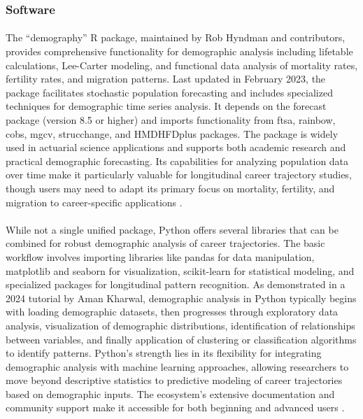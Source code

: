 \documentclass[../main.tex]{subfiles}
\begin{document}
\subsubsection{Software}

\paragraph{} The ``demography'' R package, maintained by Rob Hyndman and contributors, provides comprehensive functionality for demographic analysis including lifetable calculations, Lee-Carter modeling, and functional data analysis of mortality rates, fertility rates, and migration patterns. Last updated in February 2023, the package facilitates stochastic population forecasting and includes specialized techniques for demographic time series analysis. It depends on the forecast package (version 8.5 or higher) and imports functionality from ftsa, rainbow, cobs, mgcv, strucchange, and HMDHFDplus packages. The package is widely used in actuarial science applications and supports both academic research and practical demographic forecasting. Its capabilities for analyzing population data over time make it particularly valuable for longitudinal career trajectory studies, though users may need to adapt its primary focus on mortality, fertility, and migration to career-specific applications \citep{hyndman2023demography}.

\paragraph{} While not a single unified package, Python offers several libraries that can be combined for robust demographic analysis of career trajectories. The basic workflow involves importing libraries like pandas for data manipulation, matplotlib and seaborn for visualization, scikit-learn for statistical modeling, and specialized packages for longitudinal pattern recognition. As demonstrated in a 2024 tutorial by Aman Kharwal, demographic analysis in Python typically begins with loading demographic datasets, then progresses through exploratory data analysis, visualization of demographic distributions, identification of relationships between variables, and finally application of clustering or classification algorithms to identify patterns. Python's strength lies in its flexibility for integrating demographic analysis with machine learning approaches, allowing researchers to move beyond descriptive statistics to predictive modeling of career trajectories based on demographic inputs. The ecosystem's extensive documentation and community support make it accessible for both beginning and advanced users \citep{kharwal2024demographics}.
\end{document}
